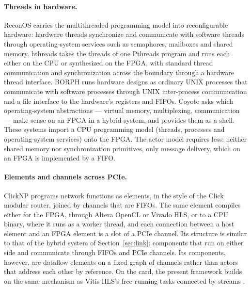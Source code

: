 \documentclass[11pt]{article}
\begin{document}
\paragraph{Threads in hardware.} ReconOS \cite{reconos2009} carries the
multithreaded programming model into reconfigurable hardware: hardware threads
synchronize and communicate with software threads through operating-system
services such as semaphores, mailboxes and shared memory. hthreads
\cite{hthreads2008} takes the threads of one Pthreads program and runs each
either on the CPU or synthesized on the FPGA, with standard thread communication
and synchronization across the boundary through a hardware thread interface.
BORPH \cite{borph2008} runs hardware designs as ordinary UNIX processes that
communicate with software processes through UNIX inter-process communication
and a file interface to the hardware's registers and FIFOs. Coyote
\cite{coyote2020} asks which operating-system abstractions --- virtual memory,
multiplexing, communication --- make sense on an FPGA in a hybrid system, and
provides them as a shell. These systems import a CPU programming model
(threads, processes and operating-system services) onto the FPGA. The actor
model requires less: neither shared memory nor synchronization primitives, only
message delivery, which on an FPGA is implemented by a FIFO.

\paragraph{Elements and channels across PCIe.} ClickNP \cite{clicknp2016}
programs network functions as elements, in the style of the Click modular
router, joined by channels that are FIFOs. The same element compiles either for
the FPGA, through Altera OpenCL or Vivado HLS, or to a CPU binary, where it runs
as a worker thread, and each connection between a host element and an FPGA
element is a slot of a PCIe channel. Its structure is similar to that of the
hybrid system of Section~\ref{sec:link}: components that run on either side and
communicate through FIFOs and PCIe channels. Its components, however, are
dataflow elements on a fixed graph of channels rather than actors that address
each other by reference. On the card, the present framework builds on the same
mechanism as Vitis HLS's free-running tasks connected by streams \cite{ug1399}.
\end{document}
